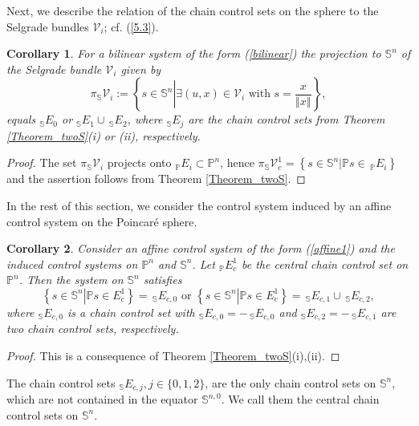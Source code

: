 \documentclass[preprint,12pt]{elsarticle}
\newtheorem{corollary}{Corollary}
\begin{document}
Next, we describe the relation of the chain control sets on the sphere to the
Selgrade bundles $\mathcal{V}_{i}$; cf. (\ref{5.3}).

\begin{corollary}
\label{Corollary_twoS}For a bilinear system of the form (\ref{bilinear}) the
projection to $\mathbb{S}^{n}$ of the Selgrade bundle $\mathcal{V}_{i}$ given
by
\[
\pi_{\mathbb{S}}\mathcal{V}_{i}:=\left\{  s\in\mathbb{S}^{n}\left\vert
\exists(u,x)\in\mathcal{V}_{i}\text{ with }s=\frac{x}{\left\Vert x\right\Vert
}\right.  \right\}  ,
\]
equals $_{\mathbb{S}}E_{0}$ or $_{\mathbb{S}}E_{1}\cup\,_{\mathbb{S}}E_{2}$,
where $_{\mathbb{S}}E_{j}$ are the chain control sets from Theorem
\ref{Theorem_twoS}(i) or (ii), respectively.
\end{corollary}

\begin{proof}
The set $\pi_{\mathbb{S}}\mathcal{V}_{i}$ projects onto $_{\mathbb{P}}%
E_{i}\subset\mathbb{P}^{n}$, hence $\pi_{\mathbb{S}}\mathcal{V}_{c}%
^{1}=\left\{  s\in\mathbb{S}^{n}\left\vert \mathbb{P}s\in\,_{\mathbb{P}}%
E_{i}\right.  \right\}  $ and the assertion follows from Theorem
\ref{Theorem_twoS}.
\end{proof}

In the rest of this section, we consider the control system induced by an
affine control system on the Poincar\'{e} sphere.

\begin{corollary}
\label{Corollary_three}Consider an affine control system of the form
(\ref{affine1}) and the induced control systems on $\mathbb{P}^{n}$ and
$\mathbb{S}^{n}$. Let $_{\mathbb{P}}E_{c}^{1}$ be the central chain control
set on $\mathbb{P}^{n}$. Then the system on $\mathbb{S}^{n}$ satisfies
\[
\left\{  s\in\mathbb{S}^{n}\left\vert \mathbb{P}s\in E_{c}^{1}\right.
\right\}  =\,_{\mathbb{S}}E_{c,0}\text{ or }\left\{  s\in\mathbb{S}%
^{n}\left\vert \mathbb{P}s\in E_{c}^{1}\right.  \right\}  =\,_{\mathbb{S}%
}E_{c,1}\cup\,_{\mathbb{S}}E_{c,2},
\]
where $_{\mathbb{S}}E_{c,0}$ is a chain control set with $_{\mathbb{S}}%
E_{c,0}=-\,_{\mathbb{S}}E_{c,0}$ and $_{\mathbb{S}}E_{c,2}=-\,_{\mathbb{S}%
}E_{c,1}$ are two chain control sets, respectively.
\end{corollary}

\begin{proof}
This is a consequence of Theorem \ref{Theorem_twoS}(i),(ii).
\end{proof}

The chain control sets $_{\mathbb{S}}E_{c,j},j\in\{0,1,2\}$, are the only
chain control sets on $\mathbb{S}^{n}$, which are not contained in the equator
$\mathbb{S}^{n,0}$. We call them the central chain control sets on
$\mathbb{S}^{n}$.
\end{document}
